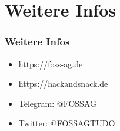 \documentclass[12pt,utf8]{beamer}
\begin{document}
\section{Weitere Infos}
	\begin{frame}
		\frametitle{Weitere Infos}
		\begin{itemize}
			\item https://foss-ag.de
			\item https://hackandsnack.de
			\item Telegram: @FOSSAG
			\item Twitter: @FOSSAGTUDO	
		\end{itemize}
	\end{frame}
\end{document}

